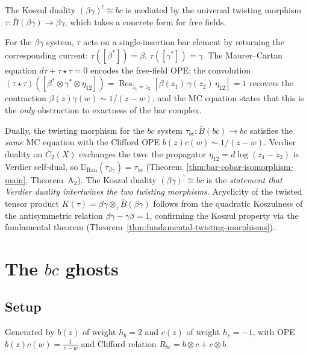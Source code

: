 \begin{remark}
\label{rem:free-field-twisting}
The Koszul duality $(\beta\gamma)^! \cong bc$ is mediated by the
universal twisting morphism
$\tau\colon \bar{B}(\beta\gamma) \to \beta\gamma$,
which takes a concrete form for free fields.

For the $\beta\gamma$ system, $\tau$ acts on a single-insertion
bar element by returning the corresponding current:
$\tau([\beta^*]) = \beta$, $\tau([\gamma^*]) = \gamma$.
The Maurer--Cartan equation $d\tau + \tau \star \tau = 0$
encodes the free-field OPE: the convolution
$(\tau \star \tau)([\beta^* \otimes \gamma^* \otimes \eta_{12}])
= \operatorname{Res}_{z_1 = z_2}[\beta(z_1)\,\gamma(z_2)\,\eta_{12}]
= 1$
recovers the contraction $\beta(z)\gamma(w) \sim 1/(z-w)$,
and the MC equation states that this is the \emph{only}
obstruction to exactness of the bar complex.

Dually, the twisting morphism for the $bc$ system
$\tau_{bc}\colon \bar{B}(bc) \to bc$ satisfies the
\emph{same} MC equation with the Clifford
OPE $b(z)c(w) \sim 1/(z-w)$.  Verdier duality on
$\overline{C}_2(X)$ exchanges the two: the propagator
$\eta_{12} = d\log(z_1 - z_2)$ is Verdier self-dual, so
$\mathbb{D}_{\mathrm{Ran}}(\tau_{\beta\gamma})
= \tau_{bc}$
(Theorem~\ref{thm:bar-cobar-isomorphism-main},
Theorem~A$_2$).
The Koszul duality $(\beta\gamma)^! \cong bc$ is the
\emph{statement that Verdier duality intertwines the two
twisting morphisms}.  Acyclicity of the twisted tensor product
$K(\tau) = \beta\gamma \otimes_\tau \bar{B}(\beta\gamma)$
follows from the quadratic Koszulness of the antisymmetric
relation $\beta\gamma - \gamma\beta = 1$, confirming the
Koszul property via the fundamental theorem
(Theorem~\ref{thm:fundamental-twisting-morphisms}).
\end{remark}

\section{\texorpdfstring{The $bc$ ghosts}{The bc ghosts}}

\subsection{Setup}

\begin{definition}
Generated by $b(z)$ of weight $h_b = 2$ and $c(z)$ of weight $h_c = -1$,
with OPE $b(z)c(w) = \frac{1}{z-w}$ and Clifford relation $R_{bc} = b \otimes c + c \otimes b$.
\end{definition}

